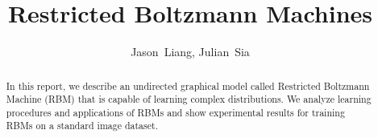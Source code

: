 \documentclass[journal]{IEEEtran}
\begin{document}
%
\title{Restricted Boltzmann Machines}


\author{Jason~Liang,
        Julian~Sia%
}

% 
%

\maketitle

\begin{abstract}
In this report, we describe an undirected graphical model called Restricted Boltzmann Machine (RBM) that is capable of learning complex distributions. We analyze learning procedures and applications of RBMs and show experimental results for training RBMs on a standard image dataset.
\end{abstract}

\IEEEpeerreviewmaketitle
\end{document}
